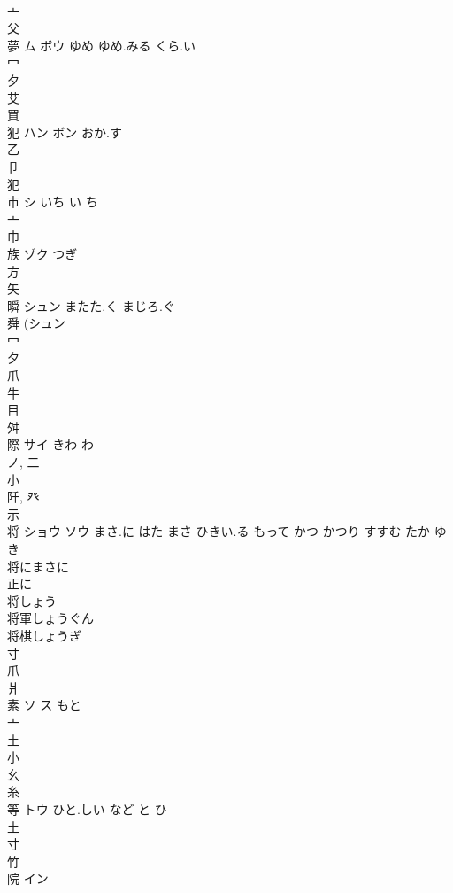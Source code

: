 \documentclass[8pt]{extreport}
\begin{document}
\begin{CJK}{UTF8}{min}
\\	亠 
\\	父 
\\	夢	ム ボウ	ゆめ ゆめ.みる くら.い	
\\	冖 
\\	夕 
\\	艾 
\\	買 
\\	犯	ハン ボン	おか.す	
\\	乙 
\\	卩 
\\	犯 
\\	市	シ	いち い ち	
\\	亠 
\\	巾 
\\	族	ゾク	つぎ	
\\	方 
\\	矢 
\\	瞬	シュン	またた.く まじろ.ぐ	
\\	舜 (シュン 
\\	冖 
\\	夕 
\\	爪 
\\	牛 
\\	目 
\\	舛 
\\	際	サイ	きわ わ	
\\	ノ, 二 
\\	小 
\\	阡, 癶 
\\	示 
\\	将	ショウ ソウ	まさ.に はた まさ ひきい.る もって かつ かつり すすむ たか ゆき	
\\	将にまさに
\\	正に 
\\	将しょう
\\	将軍しょうぐん
\\	将棋しょうぎ
\\	寸 
\\	爪 
\\	爿 
\\	素	ソ ス	もと	
\\	亠 
\\	土 
\\	小 
\\	幺 
\\	糸 
\\	等	トウ	ひと.しい など と ひ	
\\	土 
\\	寸 
\\	竹 
\\	院	イン		

\end{CJK}
\end{document}
